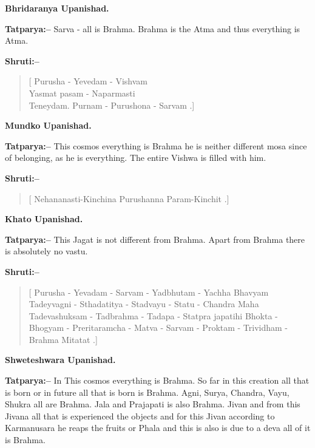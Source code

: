 \begin{flushright}
\textbf{Bhridaranya Upanishad.}
\end{flushright}

\textbf{Tatparya:–} Sarva - all is Brahma. Brahma is the Atma and thus everything is Atma.

\textbf{Shruti:–}

\begin{verse}
[ Purusha - Yevedam - Vishvam \\ Yasmat pasam - Naparmasti \\ Teneydam. Purnam - Purushona - Sarvam .]
\end{verse}

\begin{flushright}
\textbf{Mundko Upanishad.}
\end{flushright}

\textbf{Tatparya:–} This cosmos everything is Brahma he is neither different mosa since of belonging, as he is everything. The entire Vishwa is filled with him.

\textbf{Shruti:–}

\begin{verse}
[ Nehananasti-Kinchina  Purushanna Param-Kinchit .]
\end{verse}

\begin{flushright}
\textbf{Khato Upanishad.}
\end{flushright}

\textbf{Tatparya:–} This Jagat is not different from Brahma. Apart from Brahma there is absolutely no vastu.

\textbf{Shruti:–}

\begin{verse}
[ Purusha - Yevadam - Sarvam - Yadbhutam - Yachha Bhavyam  Tadeyvagni - Sthadatitya - Stadvayu - Statu - Chandra Maha  Tadevashuksam - Tadbrahma - Tadapa - Statpra japatihi  Bhokta - Bhogyam - Preritaramcha - Matva - Sarvam - Proktam - Trividham - Brahma Mitatat .]
\end{verse}

\begin{flushright}
\textbf{Shweteshwara Upanishad.}
\end{flushright}

\textbf{Tatparya:–} In This cosmos everything is Brahma. So far in this creation all that is born or in future all that is born is Brahma. Agni, Surya, Chandra, Vayu, Shukra all are Brahma. Jala and Prajapati is also Brahma. Jivan and from this Jivana all that is experienced the objects and for this Jivan according to Karmanusara he reaps the fruits or Phala and this is also is due to a deva all of it is Brahma.

